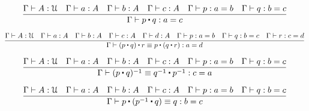 \documentclass[a4paper,UKenglish,cleveref, autoref, thm-restate]{lipics-v2021}
\newcommand{\UU}{\ensuremath{\mathcal{U}}}
\newcommand{\ct}{%
  \mathchoice{\mathbin{\raisebox{0.5ex}{$\displaystyle\centerdot$}}}%
             {\mathbin{\raisebox{0.5ex}{$\centerdot$}}}%
             {\mathbin{\raisebox{0.25ex}{$\scriptstyle\,\centerdot\,$}}}%
             {\mathbin{\raisebox{0.1ex}{$\scriptscriptstyle\,\centerdot\,$}}}
}
\begin{document}
\begin{equation*}
    \frac{\Gamma \vdash A : \UU \hspace{10pt} \Gamma \vdash a : A \hspace{10pt} \Gamma \vdash b : A \hspace{10pt} \Gamma \vdash c : A \hspace{10pt} \Gamma \vdash p : a = b \hspace{10pt} \Gamma \vdash q : b = c}{\Gamma \vdash p \ct q : a = c}
\end{equation*}

\begin{equation*}
    \frac{\Gamma \vdash A : \UU \hspace{10pt} \Gamma \vdash a : A \hspace{10pt} \Gamma \vdash b : A \hspace{10pt} \Gamma \vdash c : A \hspace{10pt} \Gamma \vdash d : A \hspace{10pt} \Gamma \vdash p : a = b \hspace{10pt} \Gamma \vdash q : b = c \hspace{10pt} \Gamma \vdash r : c = d}{\Gamma \vdash (p \ct q) \ct r \equiv p \ct (q \ct r) : a = d}
\end{equation*}

\begin{equation*}
    \frac{\Gamma \vdash A : \UU \hspace{10pt} \Gamma \vdash a : A \hspace{10pt} \Gamma \vdash b : A \hspace{10pt} \Gamma \vdash c : A \hspace{10pt} \Gamma \vdash p : a = b \hspace{10pt} \Gamma \vdash q : b = c}{\Gamma \vdash (p \ct q)^{-1} \equiv q^{-1} \ct p^{-1} : c = a}
\end{equation*}

\begin{equation*}
    \frac{\Gamma \vdash A : \UU \hspace{10pt} \Gamma \vdash a : A \hspace{10pt} \Gamma \vdash b : A \hspace{10pt} \Gamma \vdash c : A \hspace{10pt} \Gamma \vdash p : a = b \hspace{10pt} \Gamma \vdash q : b = c}{\Gamma \vdash p \ct (p^{-1} \ct q) \equiv q : b = c}
\end{equation*}
\end{document}
